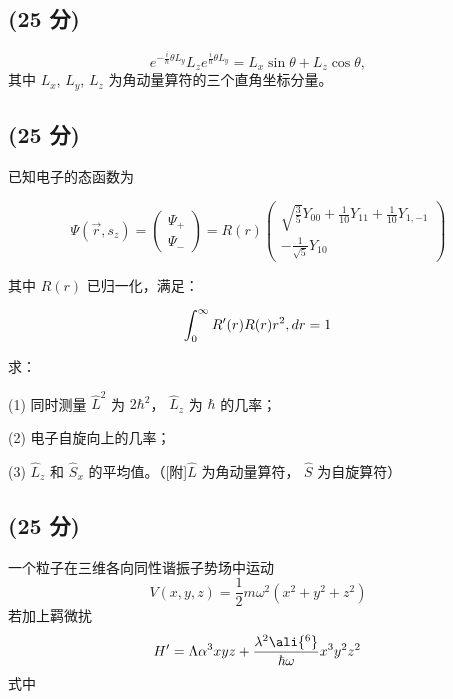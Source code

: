 \subsection{(25 分)}
\[    e^{-\frac{i}{\hbar}\theta L_y} L_z e^{\frac{i}{\hbar}\theta L_y} = L_x \sin\theta + L_z \cos\theta, ~\]
    其中 $L_x$, $L_y$, $L_z$ 为角动量算符的三个直角坐标分量。
\subsection{(25 分)}

已知电子的态函数为

\[
\Psi(\vec{r}, s_z) = \begin{pmatrix} \Psi_+ \\ \Psi_- \end{pmatrix} = R(r) \begin{pmatrix} \sqrt{\frac{3}{5}} Y_{00} + \frac{1}{10} Y_{11} + \frac{1}{10} Y_{1,-1} \\ -\frac{1}{\sqrt{5}} Y_{10} \end{pmatrix}~
\]

其中 \( R(r) \) 已归一化，满足：

\[
\int_0^\infty R'(r) R(r) r^2 \\, dr = 1~
\]

求：

(1) 同时测量 \( \hat{L}^2 \) 为 \( 2\hbar^2 \)， \( \hat{L}_z \) 为 \( \hbar \)  的几率；  

(2) 电子自旋向上的几率；  

(3) \( \hat{L}_z \) 和 \( \hat{S}_x \) 的平均值。（[附]\( \hat{L} \) 为角动量算符， \( \hat{S} \) 为自旋算符）
\subsection{(25 分)}
一个粒子在三维各向同性谐振子势场中运动
$$V(x,y,z)=\frac{1}{2}m\omega^2(x^2+y^2+z^2)~$$
若加上羁微扰$$H'=\Lambda \alpha^3xyz+\frac{\lambda^2\ali{^6}}{\hbar \omega}x^3y^2z^2~$$
式中
